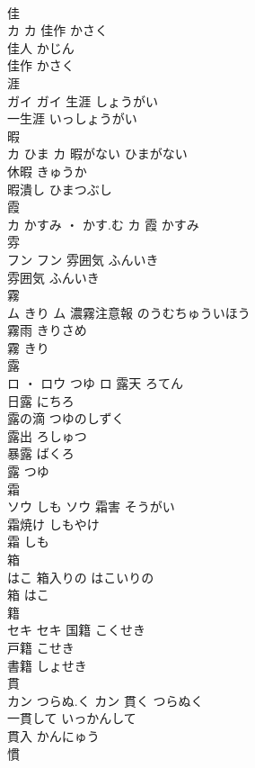 \documentclass[8pt]{extreport}
\begin{document}
\begin{CJK}{UTF8}{min}
\\	佳	
\\	カ		カ	佳作	かさく	
\\	佳人	かじん	
\\	佳作	かさく	
\\	涯	
\\	ガイ		ガイ	生涯	しょうがい	
\\	一生涯	いっしょうがい	
\\	暇	
\\	カ	ひま	カ	暇がない	ひまがない	
\\	休暇	きゅうか	
\\	暇潰し	ひまつぶし	
\\	霞	
\\	カ	かすみ ・ かす.む	カ													霞	かすみ	
\\	雰	
\\	フン		フン	雰囲気	ふんいき	
\\	雰囲気	ふんいき	
\\	霧	
\\	ム	きり	ム	濃霧注意報	のうむちゅういほう	
\\	霧雨	きりさめ	
\\	霧	きり	
\\	露	
\\	ロ ・ ロウ	つゆ	ロ	露天	ろてん	
\\	日露	にちろ	
\\	露の滴	つゆのしずく	
\\	露出	ろしゅつ	
\\	暴露	ばくろ	
\\	露	つゆ	
\\	霜	
\\	ソウ	しも	ソウ	霜害	そうがい	
\\	霜焼け	しもやけ	
\\	霜	しも	
\\	箱	
\\	はこ		箱入りの	はこいりの	
\\	箱	はこ	
\\	籍	
\\	セキ		セキ	国籍	こくせき	
\\	戸籍	こせき	
\\	書籍	しょせき	
\\	貫	
\\	カン	つらぬ.く	カン	貫く	つらぬく	
\\	一貫して	いっかんして	
\\	貫入	かんにゅう	
\\	慣	

\end{CJK}
\end{document}
